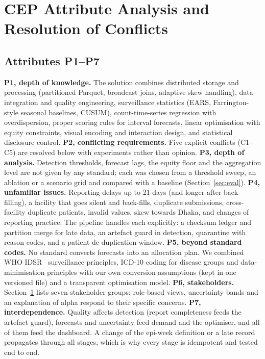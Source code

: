 \section{CEP Attribute Analysis and Resolution of Conflicts}\label{sec:cep}
\subsection{Attributes P1--P7}
\textbf{P1, depth of knowledge.} The solution combines distributed storage and processing (partitioned Parquet, broadcast joins, adaptive skew handling), data integration and quality engineering, surveillance statistics (EARS, Farrington-style seasonal baselines, CUSUM), count-time-series regression with overdispersion, proper scoring rules for interval forecasts, linear optimisation with equity constraints, visual encoding and interaction design, and statistical disclosure control.
\textbf{P2, conflicting requirements.} Five explicit conflicts (C1--C5) are resolved below with experiments rather than opinion.
\textbf{P3, depth of analysis.} Detection thresholds, forecast lags, the equity floor and the aggregation level are not given by any standard; each was chosen from a threshold sweep, an ablation or a scenario grid and compared with a baseline (Section~\ref{sec:eval}).
\textbf{P4, unfamiliar issues.} Reporting delays up to 21 days (and longer after back-filling), a facility that goes silent and back-fills, duplicate submissions, cross-facility duplicate patients, invalid values, skew towards Dhaka, and changes of reporting practice. The pipeline handles each explicitly: a checksum ledger and partition merge for late data, an artefact guard in detection, quarantine with reason codes, and a patient de-duplication window.
\textbf{P5, beyond standard codes.} No standard converts forecasts into an allocation plan. We combined WHO IDSR~\cite{idsr} surveillance principles, ICD-10 coding for disease groups and data-minimisation principles with our own conversion assumptions (kept in one versioned file) and a transparent optimisation model.
\textbf{P6, stakeholders.} Section~\ref{sec:cep} lists seven stakeholder groups; role-based views, uncertainty bands and an explanation of alpha respond to their specific concerns.
\textbf{P7, interdependence.} Quality affects detection (report completeness feeds the artefact guard), forecasts and uncertainty feed demand and the optimiser, and all of them feed the dashboard. A change of the epi-week definition or a late record propagates through all stages, which is why every stage is idempotent and tested end to end.

